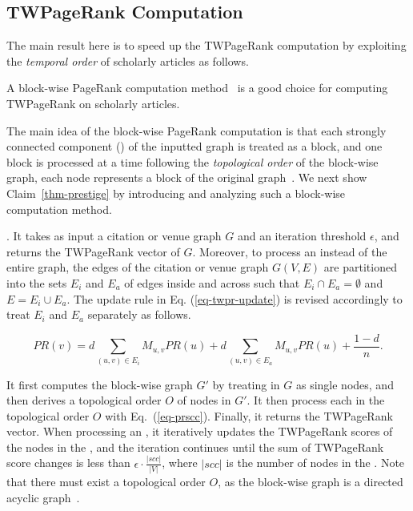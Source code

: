 \subsection{TWPageRank Computation}
\label{subsec-TWPageRank-computation}

The main result here is to speed up the TWPageRank computation by exploiting the {\em temporal order} of scholarly articles as follows.


\begin{claim}
\label{thm-prestige}
A block-wise PageRank computation method~\cite{Berkhin05} is a good choice for computing TWPageRank on scholarly articles.
\end{claim}

The main idea of the block-wise PageRank computation is that each strongly connected component (\scc) of the inputted graph is treated as a block, and one block is processed at a time following the {\em topological order} of the block-wise graph, \ie each node represents a block of the original graph~\cite{Berkhin05}.
We next show Claim~\ref{thm-prestige} by introducing and analyzing such a block-wise computation method.




.  It takes as input a citation or venue graph $G$ and an iteration threshold $\epsilon$, and returns the TWPageRank vector of $G$.
Moreover, to process an \scc instead of the entire graph, the edges of the citation or venue graph $G(V, E)$ are partitioned into the sets $E_i$ and $E_a$ of edges inside and across \sccs  such that $E_i\cap E_a = \emptyset$ and $E = E_i \cup E_a$.  The update rule in Eq. (\ref{eq-twpr-update})  is revised accordingly to treat $E_i$ and $E_a$ separately as follows.
\begin{small}
\begin{equation}\label{eq-prscc}
PR(v) =  d \sum_{(u,v)\in E_i} M_{u,v} PR(u)
  + d \sum_{(u,v)\in E_a} M_{u,v} PR(u) +  \frac{1-d}{n}.
\end{equation}
\end{small}
%
It first computes the block-wise graph $G'$ by treating \sccs in $G$ as single nodes, and then derives a topological order $O$ of nodes in $G'$. It then process each \scc in the topological order  $O$ with Eq.~(\ref{eq-prscc}). Finally, it returns the TWPageRank vector. When processing an \scc, it iteratively updates the TWPageRank scores of the nodes in the \scc, and the iteration continues until the sum of TWPageRank score changes is less than $\epsilon\cdot\frac{|scc|}{|V|}$, where $|scc|$ is the number of nodes in the \scc. Note that there must exist a topological order $O$, as the block-wise graph is a directed acyclic graph~\cite{CormenLRS01}.


